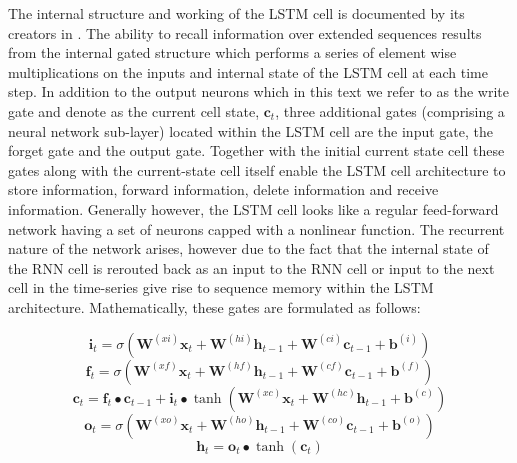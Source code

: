 \documentclass[a4paper]{article}
\begin{document}
The internal structure and working  of the LSTM cell is documented by its creators in \cite{sak2014long}. The ability to recall information over extended sequences results from the internal gated structure which performs a series of element wise multiplications on the inputs and internal state of the LSTM cell at each time step.  In addition to the output neurons which in this text we refer to as the write gate and denote as the current cell state, $\mathbf{c}_t$, three additional gates (comprising a neural network sub-layer) located within the LSTM cell are the input gate, the forget gate and the output gate.  Together with the initial current state cell these gates along with the current-state cell itself enable the LSTM cell architecture to store information, forward information, delete information and receive information.  Generally however, the LSTM cell looks like a regular feed-forward network having a set of neurons capped with a nonlinear function.  The recurrent nature of the network arises, however due to the fact that the internal state of the RNN cell is rerouted back as an input to the RNN cell or input to the next cell in the time-series give rise to sequence memory within the LSTM architecture. Mathematically, these gates are formulated as follows:

% 
\begin{equation}
\mathbf{i}_t=\sigma(\mathbf{W}^{(xi)}\mathbf{x}_t+\mathbf{W}^{(hi)}\mathbf{h}_{t-1}+\mathbf{W}^{(ci)}\mathbf{c}_{t-1}+\mathbf{b}^{(i)})
  \label{eq1}
\end{equation}
%
%
\begin{equation}
\mathbf{f}_t=\sigma(\mathbf{W}^{(xf)}\mathbf{x}_t+\mathbf{W}^{(hf)}\mathbf{h}_{t-1}+\mathbf{W}^{(cf)}\mathbf{c}_{t-1}+\mathbf{b}^{(f)})
\label{eq2}
\end{equation}
%
%
\begin{equation}
\mathbf{c}_t=\mathbf{f}_t\bullet\mathbf{c}_{t- 1}+\mathbf{i}_t\bullet\tanh(\mathbf{W}^{(xc)}\mathbf{x}_t+\mathbf{W}^{(hc)}\mathbf{h}_{t-1}+\mathbf{b}^{(c)})
\label{eq3}
\end{equation}
%
%
\begin{equation}
\mathbf{o}_t=\sigma(\mathbf{W}^{(xo)}\mathbf{x}_t+\mathbf{W}^{(ho)}\mathbf{h}_{t-1}+\mathbf{W}^{(co)}\mathbf{c}_{t-1}+\mathbf{b}^{(o)})
\label{eq4}
\end{equation}
%
%
\begin{equation}
\mathbf{h}_t=\mathbf{o}_t\bullet\tanh{(\mathbf{c}_t)} 
\label{eq5}
\end{equation}
%
\end{document}
